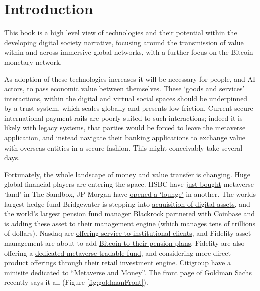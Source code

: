 \documentclass[
	12pt, %
	fleqn, %
	a4paper, %
	oneside, %
]{LegrandOrangeBook}
\begin{document}
\section{Introduction}
This book is a high level view of technologies and their potential within the developing digital society narrative, focusing around the transmission of value within and across immersive global networks, with a further focus on the Bitcoin monetary network.\par
As adoption of these technologies increases it will be necessary for people, and AI actors, to pass economic value between themselves. These `goods and services' interactions, within the digital and virtual social spaces should be underpinned by a trust system, which scales globally and presents low friction. Current secure international payment rails are poorly suited to such interactions; indeed it is likely with legacy systems, that parties would be forced to leave the metaverse application, and instead navigate their banking applications to exchange value with overseas entities in a secure fashion. This might conceivably take several days.\par 
Fortunately, the whole landscape of money and \href{https://www.omfif.org/futureofpayments2021/}{value transfer is changing}. Huge global financial players are entering the space. HSBC have \href{https://sandboxgame.medium.com/hsbc-to-become-the-first-global-financial-services-provider-to-enter-the-sandbox-c066e4f48163}{just bought} metaverse `land' in The Sandbox, JP Morgan have \href{https://www.forbes.com/sites/ronshevlin/2022/02/16/jpmorgan-opens-a-bank-branch-in-the-metaverse-but-its-not-for-what-you-think-its-for/?sh=2fbd1e90158d}{opened a `lounge'} in another. The worlds largest hedge fund Bridgewater is stepping into \href{https://uk.finance.yahoo.com/news/bitcoin-latest-price-crypto-ray-dalio-bridgewater-investment-fund-ethereum-094946686.html}{acquisition of digital assets}, and the world's largest pension fund manager Blackrock \href{https://blog.coinbase.com/coinbase-selected-by-blackrock-provide-aladdin-clients-access-to-crypto-trading-and-custody-via-b9e7144f313d}{partnered with Coinbase} and is adding these asset to their management engine (which manages tens of trillions of dollars). Nasdaq are \href{https://www.nasdaq.com/articles/nasdaq-to-launch-institutional-bitcoin-crypto-custody-services\%3A-report}{offering service to institutional clients}, and Fidelity asset management are about to add \href{https://www.wsj.com/articles/fidelity-weighs-bitcoin-trading-on-brokerage-platform-11663008698}{Bitcoin to their pension plans}. Fidelity are also offering a \href{}{dedicated metaverse tradable fund}, and considering more direct product offerings through their retail investment engine. \href{https://www.citivelocity.com/citigps/metaverse-and-money/}{Citigroup have a minisite} dedicated to ``Metaverse and Money''. The front page of Goldman Sachs recently says it all (Figure \ref{fig:goldmanFront}).\par
\end{document}

